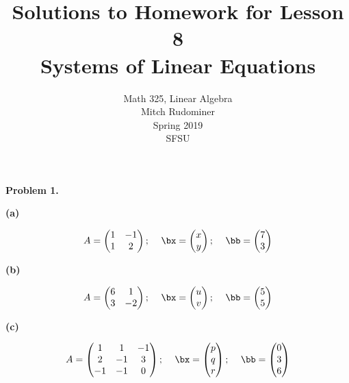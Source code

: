 \documentclass[oneside,12pt]{amsart}
\begin{document}
\title{Solutions to Homework for Lesson 8 \\ Systems of Linear Equations}
\author{Math 325, Linear Algebra \\ Mitch Rudominer \\ Spring 2019 \\ SFSU }
\date{}

\maketitle

\textbf{Problem 1.}

\smallskip

\textbf{(a)}

$$
\begin{matrix}
A=
\begin{pmatrix}
1 & -1 \\
1 & 2
\end{pmatrix}
\text{; }
&
\bx=
\begin{pmatrix}
x \\ y
\end{pmatrix}
\text{;  }
&
\bb=
\begin{pmatrix}
7 \\ 3
\end{pmatrix}
\end{matrix}
$$

\textbf{(b)}

$$
\begin{matrix}
A=
\begin{pmatrix}
6 & 1 \\
3 & -2
\end{pmatrix}
\text{; }
&
\bx=
\begin{pmatrix}
u \\ v
\end{pmatrix}
\text{;  }
&
\bb=
\begin{pmatrix}
5 \\ 5
\end{pmatrix}
\end{matrix}
$$

\textbf{(c)}

$$
\begin{matrix}
A=
\begin{pmatrix}
1 & 1  & -1\\
2 & -1 & 3 \\
-1 & -1 & 0 \\
\end{pmatrix}
\text{; }
&
\bx=
\begin{pmatrix}
p \\ q \\ r
\end{pmatrix}
\text{;  }
&
\bb=
\begin{pmatrix}
0 \\ 3 \\ 6
\end{pmatrix}
\end{matrix}
$$
\end{document}
